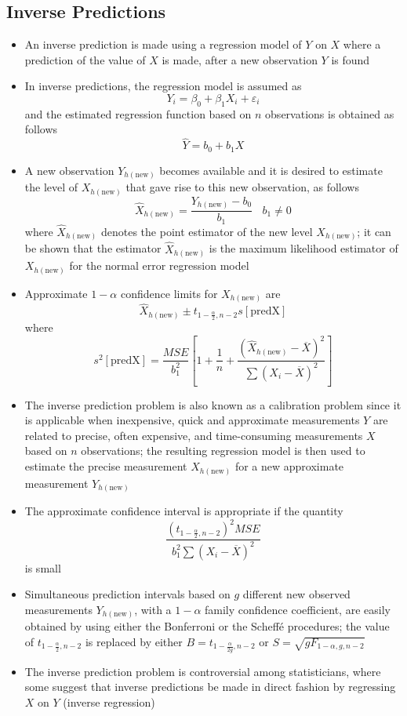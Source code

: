 \subsection{Inverse Predictions}
\begin{itemize} 
\item An inverse prediction is made using a regression model of $Y$ on $X$ where a prediction of the value of $X$ is made, after a new observation $Y$ is found
\item In inverse predictions, the regression model is assumed as $$ Y_i = \beta_0 + \beta_1X_i + \varepsilon_i $$ and the estimated regression function based on $n$ observations is obtained as follows $$ \hat{Y} = b_0 + b_1X $$ 
\item A new observation $Y_{h(\text{new})}$ becomes available and it is desired to estimate the level of $X_{h(\text{new})}$ that gave rise to this new observation, as follows $$ \hat{X}_{h(\text{new})} = \frac{Y_{h(\text{new})} - b_0}{b_1} ~~~~ b_1 \neq 0 $$  where $\hat{X}_{h(\text{new})}$ denotes the point estimator of the new level $X_{h(\text{new})}$; it can be shown that the estimator $\hat{X}_{h(\text{new})}$ is the maximum likelihood estimator of $X_{h(\text{new})}$ for the normal error regression model
\item Approximate $1-\alpha$ confidence limits for $X_{h(\text{new})}$ are $$ \hat{X}_{h(\text{new})} \pm t_{1-\frac{\alpha}{2}, n-2} s[\text{predX}] $$ where $$ s^2[\text{predX}] = \frac{MSE}{b_1^2}\left[1 + \frac{1}{n} + \frac{(\hat{X}_{h(\text{new})} - \overline{X})^2}{\sum (X_i - \overline{X})^2}\right] $$ 
\item The inverse prediction problem is also known as a calibration problem since it is applicable when inexpensive, quick and approximate measurements $Y$ are related to precise, often expensive, and time-consuming measurements $X$ based on $n$ observations; the resulting regression model is then used to estimate the precise measurement $X_{h(\text{new})}$ for a new approximate measurement $Y_{h(\text{new})}$
\item The approximate confidence interval is appropriate if the quantity $$ \frac{(t_{1 - \frac{\alpha}{2}, n-2})^2 MSE}{b_1^2 \sum (X_i - \overline{X})^2} $$ is small
\item Simultaneous prediction intervals based on $g$ different new observed measurements $Y_{h(\text{new})}$, with a $1-\alpha$ family confidence coefficient, are easily obtained by using either the Bonferroni or the Scheffé procedures; the value of $t_{1-\frac{\alpha}{2}, n-2}$ is replaced by either $B = t_{1-\frac{\alpha}{2g}, n-2}$ or $S = \sqrt{gF_{1-\alpha, g, n-2}}$ 
\item The inverse prediction problem is controversial among statisticians, where some suggest that inverse predictions be made in direct fashion by regressing $X$ on $Y$ (inverse regression)
\end{itemize} 

